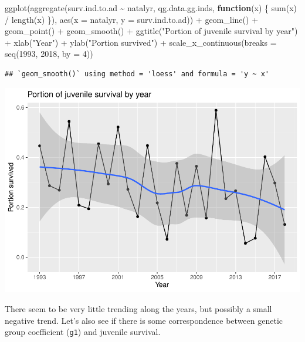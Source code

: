 \documentclass[
]{article}
\newenvironment{Shaded}{\begin{snugshade}}{\end{snugshade}}
\newcommand{\AttributeTok}[1]{\textcolor[rgb]{0.77,0.63,0.00}{#1}}
\newcommand{\ControlFlowTok}[1]{\textcolor[rgb]{0.13,0.29,0.53}{\textbf{#1}}}
\newcommand{\DecValTok}[1]{\textcolor[rgb]{0.00,0.00,0.81}{#1}}
\newcommand{\FunctionTok}[1]{\textcolor[rgb]{0.00,0.00,0.00}{#1}}
\newcommand{\NormalTok}[1]{#1}
\newcommand{\SpecialCharTok}[1]{\textcolor[rgb]{0.00,0.00,0.00}{#1}}
\newcommand{\StringTok}[1]{\textcolor[rgb]{0.31,0.60,0.02}{#1}}
\begin{document}
\begin{Shaded}
\begin{Highlighting}[]
\FunctionTok{ggplot}\NormalTok{(}\FunctionTok{aggregate}\NormalTok{(surv.ind.to.ad }\SpecialCharTok{\textasciitilde{}}\NormalTok{ natalyr, qg.data.gg.inds, }\ControlFlowTok{function}\NormalTok{(x) \{}
  \FunctionTok{sum}\NormalTok{(x) }\SpecialCharTok{/} \FunctionTok{length}\NormalTok{(x)}
\NormalTok{\}), }\FunctionTok{aes}\NormalTok{(}\AttributeTok{x =}\NormalTok{ natalyr, }\AttributeTok{y =}\NormalTok{ surv.ind.to.ad)) }\SpecialCharTok{+}
  \FunctionTok{geom\_line}\NormalTok{() }\SpecialCharTok{+}
  \FunctionTok{geom\_point}\NormalTok{() }\SpecialCharTok{+}
  \FunctionTok{geom\_smooth}\NormalTok{() }\SpecialCharTok{+}
  \FunctionTok{ggtitle}\NormalTok{(}\StringTok{"Portion of juvenile survival by year"}\NormalTok{) }\SpecialCharTok{+}
  \FunctionTok{xlab}\NormalTok{(}\StringTok{"Year"}\NormalTok{) }\SpecialCharTok{+}
  \FunctionTok{ylab}\NormalTok{(}\StringTok{"Portion survived"}\NormalTok{) }\SpecialCharTok{+}
  \FunctionTok{scale\_x\_continuous}\NormalTok{(}\AttributeTok{breaks =} \FunctionTok{seq}\NormalTok{(}\DecValTok{1993}\NormalTok{, }\DecValTok{2018}\NormalTok{, }\AttributeTok{by =} \DecValTok{4}\NormalTok{))}
\end{Highlighting}
\end{Shaded}

\begin{verbatim}
## `geom_smooth()` using method = 'loess' and formula = 'y ~ x'
\end{verbatim}

\includegraphics{EDA_files/figure-latex/unnamed-chunk-9-1.pdf}

There seem to be very little trending along the years, but possibly a
small negative trend. Let's also see if there is some correspondence
between genetic group coefficient (\texttt{g1}) and juvenile survival.
\end{document}
